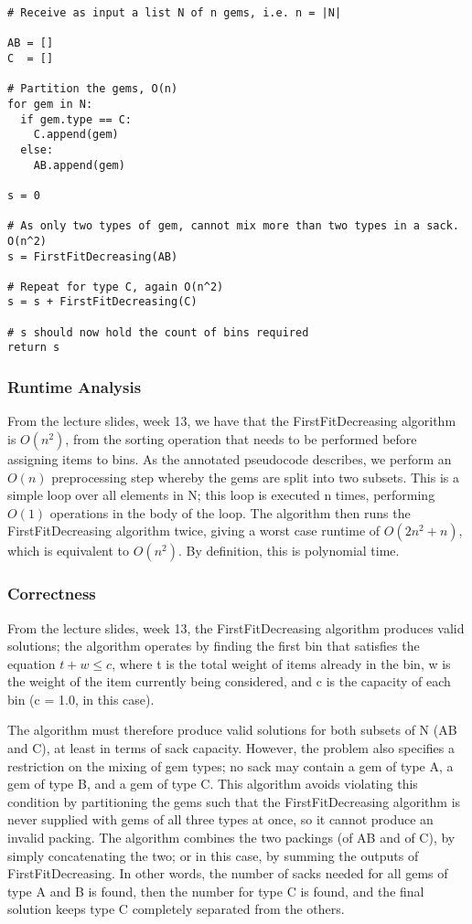 \documentclass[paper=a4, fontsize=12pt]{article}
\begin{document}
\begin{lstlisting}
# Receive as input a list N of n gems, i.e. n = |N|

AB = []
C  = []

# Partition the gems, O(n)
for gem in N:
  if gem.type == C:
    C.append(gem)
  else:
    AB.append(gem)

s = 0

# As only two types of gem, cannot mix more than two types in a sack. O(n^2)
s = FirstFitDecreasing(AB)

# Repeat for type C, again O(n^2)
s = s + FirstFitDecreasing(C)

# s should now hold the count of bins required
return s
\end{lstlisting}

\subsubsection{Runtime Analysis}
From the lecture slides, week 13, we have that the FirstFitDecreasing algorithm
is \(O(n^2)\), from the sorting operation that needs to be performed before
assigning items to bins. As the annotated pseudocode describes, we perform an
\(O(n)\) preprocessing step whereby the gems are split into two subsets. This
is a simple loop over all elements in N; this loop is executed n times,
performing \(O(1)\) operations in the body of the loop. The algorithm then runs
the FirstFitDecreasing algorithm twice, giving a worst case runtime of \(O(2n^2
+ n)\), which is equivalent to \(O(n^2)\). By definition, this is polynomial
time.

\subsubsection{Correctness}
From the lecture slides, week 13, the FirstFitDecreasing algorithm produces
valid solutions; the algorithm operates by finding the first bin that satisfies
the equation \(t + w \leq c\), where t is the total weight of items already in
the bin, w is the weight of the item currently being considered, and c is the
capacity of each bin (c = 1.0, in this case).

The algorithm must therefore produce valid solutions for both subsets of N (AB
and C), at least in terms of sack capacity. However, the problem also specifies
a restriction on the mixing of gem types; no sack may contain a gem of type A,
a gem of type B, and a gem of type C. This algorithm avoids violating this
condition by partitioning the gems such that the FirstFitDecreasing algorithm
is never supplied with gems of all three types at once, so it cannot produce an
invalid packing. The algorithm combines the two packings (of AB and of C), by
simply concatenating the two; or in this case, by summing the outputs of
FirstFitDecreasing. In other words, the number of sacks needed for all gems of
type A and B is found, then the number for type C is found, and the final
solution keeps type C completely separated from the others.
\end{document}
